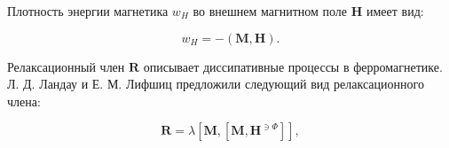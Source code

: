 \documentclass[10pt]{article}
\begin{document}
Плотность энергии магнетика $w_{H}$ во внешнем магнитном поле $\boldsymbol{H}$ имеет вид:



\[

w_{H}=-(\boldsymbol{M}, \boldsymbol{H}) .

\]



Релаксационный член $\boldsymbol{R}$ описывает диссипативные процессы в ферромагнетике. Л. Д. Ландау и Е. М. Лифшиц предложили следующий вид релаксационного члена:



\[

\boldsymbol{R}=\lambda\left[\boldsymbol{M},\left[\boldsymbol{M}, \boldsymbol{H}^{\ni \Phi}\right]\right],

\]
\end{document}
